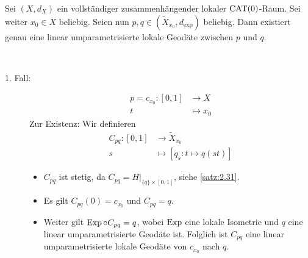 \begin{lemma}
\label{lemma:2.38}
	Sei $(X,d_X)$ ein vollständiger zusammenhängender lokaler $\operatorname{CAT(0)}$-Raum.
	Sei weiter $x_0 \in X$ beliebig.
	Seien nun $p,q \in (\tilde{X}_{x_0},d_{\exp})$ beliebig.
	Dann existiert genau eine linear umparametrisierte lokale Geodäte zwischen $p$ und $q$.
\end{lemma}
\newpage
\begin{beweis}
	\mbox{} \\[-.9cm]
	\begin{description}
		\item[1. Fall:] \begin{align*}
			p = c_{x_0}\colon [0,1] &\longrightarrow X \\
			t &\longmapsto x_0
		\end{align*} 
		Zur Existenz: Wir definieren
		\begin{align*}
			C_{pq}\colon [0,1] &\longrightarrow \tilde{X}_{x_0} \\
			s &\longmapsto [q_s \colon t \mapsto q(st)]
		\end{align*}
		\begin{itemize}
			\item $C_{pq}$ ist stetig, da $C_{pq} = H \big|_{\{q\} \times [0,1]}$, siehe \autoref{satz:2.31}.
			\item Es gilt $C_{pq}(0) = c_{x_0}$ und $C_{pq} = q$.
			\item Weiter gilt $\operatorname{Exp} \circ C_{pq} = q$, wobei $\operatorname{Exp}$ eine lokale Isometrie und $q$ eine linear umparametrisierte Geodäte ist.
			Folglich ist $C_{pq}$ eine linear umparametrisierte lokale Geodäte von $c_{x_0}$ nach $q.$
		\end{itemize}
		

\end{description}
\end{beweis}
